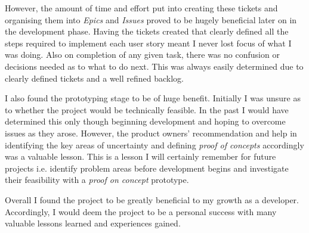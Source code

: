   However, the amount of time and effort put into creating these tickets and organising them into \textit{Epics} and \textit{Issues} proved to be hugely beneficial later on in the development phase. Having the tickets created that clearly defined all the steps required to implement each user story meant I never lost focus of what I was doing. Also on completion of any given task, there was no confusion or decisions needed as to what to do next. This was always easily determined due to clearly defined tickets and a well refined backlog.
  
  I also found the prototyping stage to be of huge benefit. Initially I was unsure as to whether the project would be technically feasible. In the past I would have determined this only though beginning development and hoping to overcome issues as they arose. However, the product owners' recommendation and help in identifying the key areas of uncertainty and defining \textit{proof of concepts} accordingly was a valuable lesson. This is a lesson I will certainly remember for future projects i.e. identify problem areas before development begins and investigate their feasibility with a \textit{proof on concept} prototype.
  
  Overall I found the project to be greatly beneficial to my growth as a developer. Accordingly, I would deem the project to be a personal success with many valuable lessons learned and experiences gained. 
  
  
  
